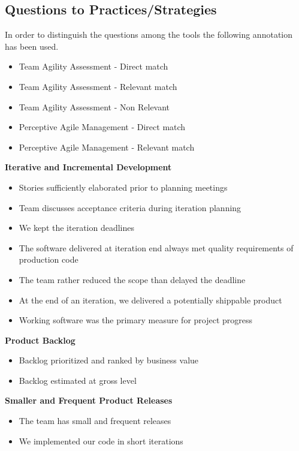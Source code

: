 \begin{appendices}

\section{Questions to Practices/Strategies}

\newcommand*\taa{\item[\FiveStar]}
\newcommand*\taar{\item[\FiveStarShadow]}
\newcommand*\taanr{\item[\SnowflakeChevron]}
\newcommand*\pam{\item[\AsteriskBold]}
\newcommand*\pamr{\item[\AsteriskThinCenterOpen]}

In order to distinguish the questions among the tools the following annotation has been used. 
\begin{itemize}
  \taa Team Agility Assessment - Direct match
  \taar Team Agility Assessment - Relevant match
  \taanr Team Agility Assessment - Non Relevant
  \pam Perceptive Agile Management - Direct match
  \pamr Perceptive Agile Management - Relevant match
\end{itemize}

\vspace{0.5cm}

\textbf{Iterative and Incremental Development}
\begin{itemize}
	\taa Stories sufficiently elaborated prior to planning meetings
	\taar Team discusses acceptance criteria during iteration planning
	\pam We kept the iteration deadlines
	\pamr The software delivered at iteration end always met quality requirements of production code
	\pamr The team rather reduced the scope than delayed the deadline
	\pamr At the end of an iteration, we delivered a potentially shippable product
	\pamr Working software was the primary measure for project progress
\end{itemize}

\textbf{Product Backlog}
\begin{itemize}
	\taa Backlog prioritized and ranked by business value
	\taar Backlog estimated at gross level %
\end{itemize}

\textbf{Smaller and Frequent Product Releases}
\begin{itemize}
	\taa The team has small and frequent releases
	\pam We implemented our code in short iterations
\end{itemize}


\end{appendices}
